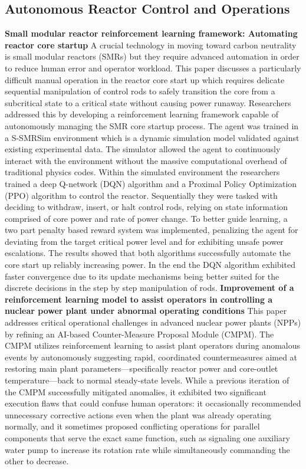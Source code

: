 \documentclass{article}
\begin{document}
\subsection{Autonomous Reactor Control and Operations}
\textbf{Small modular reactor reinforcement learning framework: Automating reactor core startup}
\newline
A crucial technology in moving toward carbon neutrality is small modular reactors (SMRs) but they require advanced automation in order to reduce human error and operator workload. This paper discusses a particularly difficult manual operation in the reactor core start up which requires delicate sequential manipulation of control rods to safely transition the core from a subcritical state to a critical state without causing power runaway. Researchers addressed this by developing a reinforcement learning framework capable of autonomously managing the SMR core startup process. The agent was trained in a S-SMRSim environment which is a dynamic simulation model validated against existing experimental data. The simulator allowed the agent to continuously interact with the environment without the massive computational overhead of traditional physics codes.
\newline
Within the simulated environment the researchers trained a deep Q-network (DQN) algorithm and a Proximal Policy Optimization (PPO) algorithm to control the reactor. Sequentially they were tasked with deciding to withdraw, insert, or halt control rods, relying on state information comprised of core power and rate of power change. To better guide learning, a two part penalty based reward system was implemented, penalizing the agent for deviating from the target critical power level and for exhibiting unsafe power escalations. The results showed that both algorithms successfully automate the core start up reliably increasing power. In the end the DQN algorithm exhibited faster convergence due to its update mechanisms being better suited for the discrete decisions in the step by step manipulation of rods.
\newline
\textbf{Improvement of a reinforcement learning model to assist operators in controlling a nuclear power plant under abnormal operating conditions}
\newline
This paper addresses critical operational challenges in advanced nuclear power plants (NPPs) by refining an AI-based Counter-Measure Proposal Module (CMPM). The CMPM utilizes reinforcement learning to assist plant operators during anomalous events by autonomously suggesting rapid, coordinated countermeasures aimed at restoring main plant parameters—specifically reactor power and core-outlet temperature—back to normal steady-state levels. While a previous iteration of the CMPM successfully mitigated anomalies, it exhibited two significant execution flaws that could confuse human operators: it occasionally recommended unnecessary corrective actions even when the plant was already operating normally, and it sometimes proposed conflicting operations for parallel components that serve the exact same function, such as signaling one auxiliary water pump to increase its rotation rate while simultaneously commanding the other to decrease.
\end{document}
